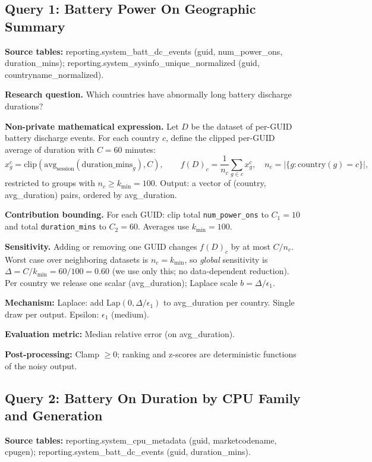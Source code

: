 \documentclass[12pt,letterpaper]{article}
\begin{document}
\subsection{Query 1: Battery Power On Geographic Summary}
\label{sec:q1}

\textbf{Source tables:} reporting.system\_batt\_dc\_events (guid, num\_power\_ons, duration\_mins); reporting.system\_sysinfo\_unique\_normalized (guid, countryname\_normalized).

\textbf{Research question.} Which countries have abnormally long battery discharge durations?

\textbf{Non-private mathematical expression.} Let $D$ be the dataset of per-GUID battery discharge events. For each country $c$, define the clipped per-GUID average of duration with $C = 60$ minutes:
\[
x_g^c = \text{clip}(\text{avg}_{\text{session}}(\text{duration\_mins}_g), C), \qquad
f(D)_c = \frac{1}{n_c} \sum_{g \in c} x_g^c, \quad n_c = |\{g : \text{country}(g) = c\}|,
\]
restricted to groups with $n_c \geq k_{\min} = 100$. Output: a vector of (country, avg\_duration) pairs, ordered by avg\_duration.

\textbf{Contribution bounding.} For each GUID: clip total \texttt{num\_power\_ons} to $C_1 = 10$ and total \texttt{duration\_mins} to $C_2 = 60$. Averages use $k_{\min} = 100$.

\textbf{Sensitivity.} Adding or removing one GUID changes $f(D)_c$ by at most $C/n_c$. Worst case over neighboring datasets is $n_c = k_{\min}$, so \emph{global} sensitivity is $\Delta = C/k_{\min} = 60/100 = 0.60$ (we use only this; no data-dependent reduction). Per country we release one scalar (avg\_duration); Laplace scale $b = \Delta/\epsilon_1$.

\textbf{Mechanism:} Laplace: add $\text{Lap}(0, \Delta/\epsilon_1)$ to avg\_duration per country. Single draw per output. Epsilon: $\epsilon_1$ (medium).

\textbf{Evaluation metric:} Median relative error (on avg\_duration).

\textbf{Post-processing:} Clamp $\geq 0$; ranking and z-scores are deterministic functions of the noisy output.

\subsection{Query 2: Battery On Duration by CPU Family and Generation}
\label{sec:q2}

\textbf{Source tables:} reporting.system\_cpu\_metadata (guid, marketcodename, cpugen); reporting.system\_batt\_dc\_events (guid, duration\_mins).
\end{document}
